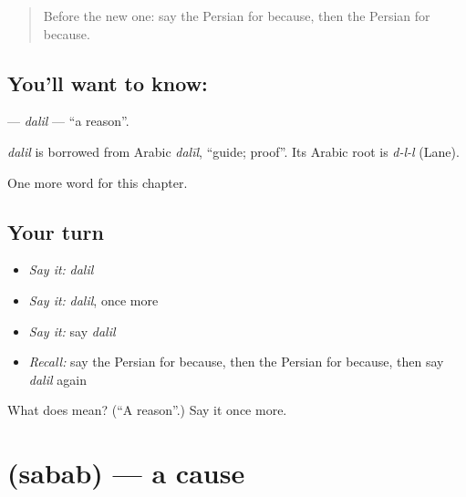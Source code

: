 \label{lesson:FA-C92-dalil}



\begin{quote}
Before the new one: say the Persian for because, then the Persian for because.
\end{quote}

\subsection*{You'll want to know: }
\textbf{} — \emph{dalil} — \textquotedblleft{}a reason\textquotedblright{}.

\begin{cousinweb}
\emph{dalil} is borrowed from Arabic \emph{dalīl}, \textquotedblleft{}guide; proof\textquotedblright{}. Its Arabic root is \emph{d-l-l} (Lane).
\end{cousinweb}

\begin{grammarlens}[title={What you've built}]
One more word for this chapter.
\end{grammarlens}

\subsection*{Your turn}
\begin{itemize}
\raggedright
  \item \emph{Say it:} \emph{dalil}
  \item \emph{Say it:} \emph{dalil}, once more
  \item \emph{Say it:} say \emph{dalil}
  \item \emph{Recall:} say the Persian for because, then the Persian for because, then say \emph{dalil} again
\end{itemize}

\begin{tcolorbox}[breakable,colback=teal!4,colframe=teal!35!black,title={Before you move on}]
What does  mean? (\textquotedblleft{}A reason\textquotedblright{}.) Say it once more.
\end{tcolorbox}
\section[\texorpdfstring{\fa{سبب} (sabab)}{سبب (sabab)}]{ (sabab) — a cause}

\label{lesson:FA-C92-sabab}




